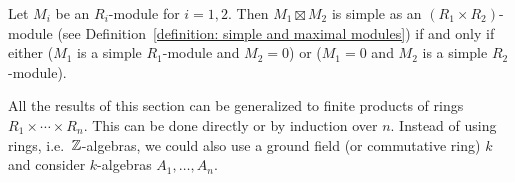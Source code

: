 \begin{corollary}
  Let $M_i$ be an $R_i$-module for $i = 1, 2$.
  Then $M_1 \boxtimes M_2$ is simple as an $(R_1 \times R_2)$-module (see Definition~\ref{definition: simple and maximal modules}) if and only if either ($M_1$ is a simple $R_1$-module and $M_2 = 0$) or ($M_1 = 0$ and $M_2$ is a simple $R_2$-module).
\end{corollary}


\begin{remark}
  All the results of this section can be generalized to finite products of rings $R_1 \times \dotsb \times R_n$.
  This can be done directly or by induction over $n$.
  Instead of using rings, i.e.\ $\mathbb{Z}$-algebras, we could also use a ground field (or commutative ring) $k$ and consider $k$-algebras $A_1, \dotsc, A_n$.
\end{remark}


